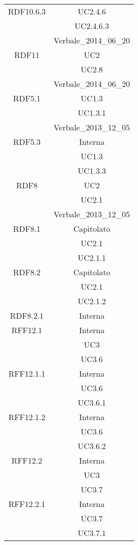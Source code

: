 \begin{longtable}{|c|c|}
\midrule
RDF10.6.3
& UC2.4.6\\
& UC2.4.6.3\\
& Verbale\_2014\_06\_20\\

\midrule
RDF11
& UC2\\
& UC2.8\\
& Verbale\_2014\_06\_20\\

\midrule
RDF5.1
& UC1.3\\
& UC1.3.1\\
& Verbale\_2013\_12\_05\\

\midrule
RDF5.3
& Interna\\
& UC1.3\\
& UC1.3.3\\

\midrule
RDF8
& UC2\\
& UC2.1\\
& Verbale\_2013\_12\_05\\

\midrule
RDF8.1
& Capitolato\\
& UC2.1\\
& UC2.1.1\\

\midrule
RDF8.2
& Capitolato\\
& UC2.1\\
& UC2.1.2\\

\midrule
RDF8.2.1
& Interna\\

\midrule
RFF12.1
& Interna\\
& UC3\\
& UC3.6\\

\midrule
RFF12.1.1
& Interna\\
& UC3.6\\
& UC3.6.1\\

\midrule
RFF12.1.2
& Interna\\
& UC3.6\\
& UC3.6.2\\

\midrule
RFF12.2
& Interna\\
& UC3\\
& UC3.7\\

\midrule
RFF12.2.1
& Interna\\
& UC3.7\\
& UC3.7.1\\


\end{longtable}
